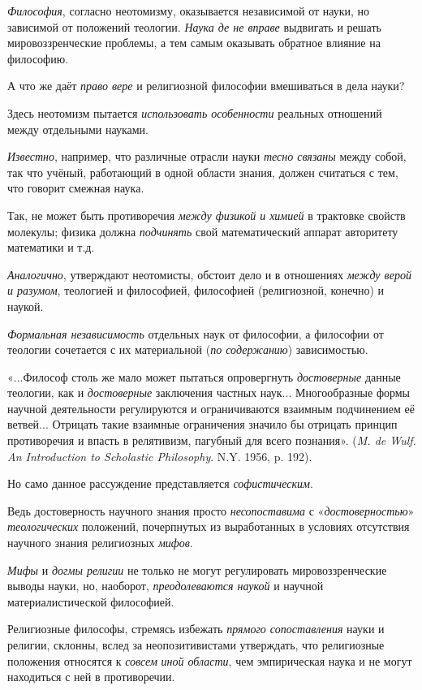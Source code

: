 \documentclass[a4paper,14pt,russian]{extreport}
\begin{document}
\emph{Философия}, согласно неотомизму, оказывается независимой от науки, но зависимой от положений теологии. \emph{Наука де не вправе} выдвигать и решать мировоззренческие проблемы, а тем самым оказывать обратное влияние на философию.

А что же даёт \emph{право вере} и религиозной философии вмешиваться в дела науки?

Здесь неотомизм пытается \emph{использовать особенности} реальных отношений между отдельными науками.

\emph{Известно}, например, что различные отрасли науки \emph{тесно связаны} между собой, так что учёный, работающий в одной области знания, должен считаться с тем, что говорит смежная наука.

Так, не может быть противоречия \emph{между физикой и химией} в трактовке свойств молекулы; физика должна \emph{подчинять} свой математический аппарат авторитету математики и т.д.

\emph{Аналогично}, утверждают неотомисты, обстоит дело и в отношениях \emph{между верой и разумом}, теологией и философией, философией (религиозной, конечно) и наукой.

\emph{Формальная независимость} отдельных наук от философии, а философии от теологии сочетается с их материальной (\emph{по содержанию}) зависимостью.

«...Философ столь же мало может пытаться опровергнуть \emph{достоверные} данные теологии, как и \emph{достоверные} заключения частных наук... Многообразные формы научной деятельности регулируются и ограничиваются взаимным подчинением её ветвей... Отрицать такие взаимные ограничения значило бы отрицать принцип противоречия и впасть в релятивизм, пагубный для всего познания». (\emph{M. de Wulf. An Introduction to Scholastic Philosophy}. N.Y. 1956, p. 192).

Но само данное рассуждение представляется \emph{софистическим}.

Ведь достоверность научного знания просто \emph{несопоставима} с «\emph{достоверностью}» \emph{теологических} положений, почерпнутых из выработанных в условиях отсутствия научного знания религиозных \emph{мифов}.

\emph{Мифы} и \emph{догмы религии} не только не могут регулировать мировоззренческие выводы науки, но, наоборот, \emph{преодолеваются наукой} и научной материалистической философией.

Религиозные философы, стремясь избежать \emph{прямого сопоставления} науки и религии, склонны, вслед за неопозитивистами утверждать, что религиозные положения относятся к \emph{совсем} \emph{иной области}, чем эмпирическая наука и не могут находиться с ней в противоречии.
\end{document}
